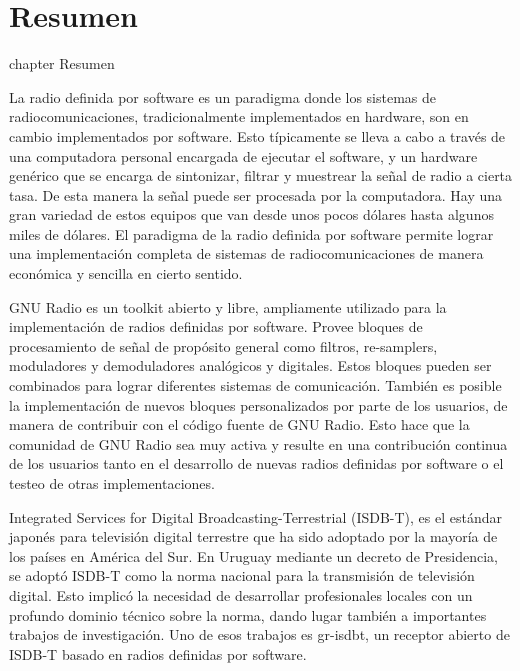 \chapter*{Resumen}
 {chapter} {Resumen}%

La radio definida por software es un paradigma donde los sistemas de radiocomunicaciones, tradicionalmente implementados en hardware, son en cambio implementados por software. Esto típicamente se lleva a cabo a través de una computadora personal encargada de ejecutar el software, y un hardware genérico que se encarga de sintonizar, filtrar y muestrear la señal de radio a cierta tasa. De esta manera la señal puede ser procesada por la computadora.
Hay una gran variedad de estos equipos que van desde unos pocos dólares hasta algunos miles de dólares. El paradigma de la radio definida por software permite lograr una implementación completa de sistemas de radiocomunicaciones de manera económica y sencilla en cierto sentido.

GNU Radio es un toolkit abierto y libre, ampliamente utilizado para la implementación de radios definidas por software. Provee bloques de procesamiento de señal de propósito general como filtros, re-samplers, moduladores y demoduladores analógicos y digitales. Estos bloques pueden ser combinados para lograr diferentes sistemas de comunicación. También es posible la implementación de nuevos bloques personalizados por parte de los usuarios, de manera de contribuir con el código fuente de GNU Radio. Esto hace que la comunidad de GNU Radio sea muy activa y resulte en una contribución continua de los usuarios tanto en el desarrollo de nuevas radios definidas por software o el testeo de otras implementaciones.

Integrated Services for Digital Broadcasting-Terrestrial (ISDB-T), es el estándar japonés para televisión digital terrestre que ha sido adoptado por la mayoría de los países en América del Sur. En Uruguay mediante un decreto de Presidencia, se adoptó ISDB-T como la norma nacional para la transmisión de televisión digital. Esto implicó la necesidad de desarrollar profesionales locales con un profundo dominio técnico sobre la norma, dando lugar también a importantes trabajos de investigación. Uno de esos trabajos es gr-isdbt, un receptor abierto de ISDB-T basado en radios definidas por software.


